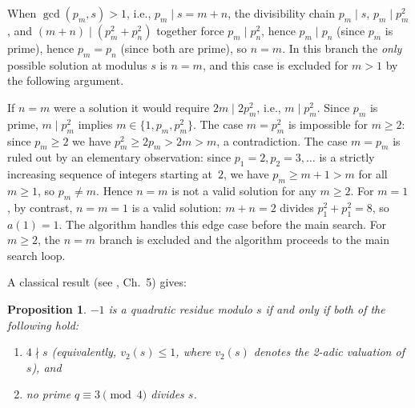 \documentclass[12pt]{article}
\newtheorem{proposition}{Proposition}
\begin{document}
	When $\gcd(p_m, s) > 1$, i.e., $p_m \mid s = m+n$, the divisibility
	chain $p_m \mid s$, $p_m \mid p_m^2$, and $(m+n) \mid (p_m^2 + p_n^2)$
	together force $p_m \mid p_n^2$, hence $p_m \mid p_n$ (since $p_m$ is
	prime), hence $p_m = p_n$ (since both are prime), so $n = m$.
	In this branch the \emph{only} possible solution at modulus $s$ is
	$n = m$, and this case is excluded for $m > 1$ by the following
	argument.
	
	If $n = m$ were a solution it would require $2m \mid 2p_m^2$,
	i.e., $m \mid p_m^2$.
	Since $p_m$ is prime, $m \mid p_m^2$ implies $m \in \{1, p_m, p_m^2\}$.
	The case $m = p_m^2$ is impossible for $m \geq 2$: since $p_m \geq 2$
	we have $p_m^2 \geq 2p_m > 2m > m$, a contradiction.
	The case $m = p_m$ is ruled out by an elementary observation: since
	$p_1 = 2, p_2 = 3, \ldots$ is a strictly increasing sequence of
	integers starting at~$2$, we have $p_m \geq m + 1 > m$ for all
	$m \geq 1$, so $p_m \neq m$.
	Hence $n = m$ is not a valid solution for any $m \geq 2$.
	For $m = 1$, by contrast, $n = m = 1$ is a valid solution: $m + n = 2$
	divides $p_1^2 + p_1^2 = 8$, so $a(1) = 1$.
	The algorithm handles this edge case before the main search.
	For $m \geq 2$, the $n = m$ branch is excluded and the algorithm
	proceeds to the main search loop.
	
	A classical result (see \cite{IrelandRosen}, Ch.~5) gives:
	
	\begin{proposition}\label{prop:qr}
		$-1$ is a quadratic residue modulo $s$ if and only if both of the
		following hold:
		\begin{enumerate}
			\item[(a)] $4 \nmid s$ \textup{(}equivalently, $v_2(s) \leq 1$,
			where $v_2(s)$ denotes the 2-adic valuation of $s$\textup{)}, and
			\item[(b)] no prime $q \equiv 3 \pmod{4}$ divides $s$.
		\end{enumerate}
	\end{proposition}
	
\end{document}
